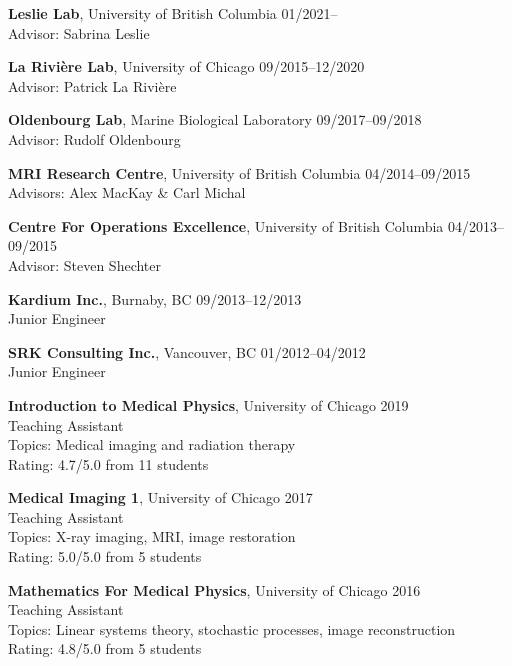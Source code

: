 \documentclass[12pt,letterpaper]{article}
\begin{document}
\begin{benumerate}{5}
\item
  {\textbf{Leslie Lab}, University of British Columbia} \hfill 01/2021--\\
  Advisor: Sabrina Leslie
\item
  {\textbf{La Rivi\`ere Lab}, University of Chicago} \hfill 09/2015--12/2020\\
  Advisor: Patrick La Rivi\`ere 
\item
  {\textbf{Oldenbourg Lab}, Marine Biological Laboratory} \hfill 09/2017--09/2018\\
  Advisor: Rudolf Oldenbourg
\item
  {\textbf{MRI Research Centre}, University of British Columbia} \hfill 04/2014--09/2015\\
  Advisors: Alex MacKay \& Carl Michal
\item
  {\textbf{Centre For Operations Excellence}, University of British Columbia} \hfill 04/2013--09/2015\\
  Advisor: Steven Shechter
\end{benumerate}

\begin{benumerate}{2}
\item
  \textbf{Kardium Inc.}, Burnaby, BC \hfill 09/2013--12/2013\\
  Junior Engineer
\item
  \textbf{SRK Consulting Inc.}, Vancouver, BC \hfill 01/2012--04/2012\\
  Junior Engineer
\end{benumerate}

\begin{benumerate}{3}
\item
  \textbf{Introduction to Medical Physics}, University of Chicago \hfill 2019\\
  Teaching Assistant\\
  Topics: Medical imaging and radiation therapy\\
  Rating: 4.7/5.0 from 11 students
\item
  \textbf{Medical Imaging 1}, University of Chicago \hfill 2017\\
  Teaching Assistant\\
  Topics: X-ray imaging, MRI, image restoration\\
  Rating: 5.0/5.0 from 5 students
\item
  \textbf{Mathematics For Medical Physics}, University of Chicago \hfill 2016\\
  Teaching Assistant\\
  Topics: Linear systems theory, stochastic processes, image reconstruction\\
  Rating: 4.8/5.0 from 5 students
\end{benumerate}
\end{document}
